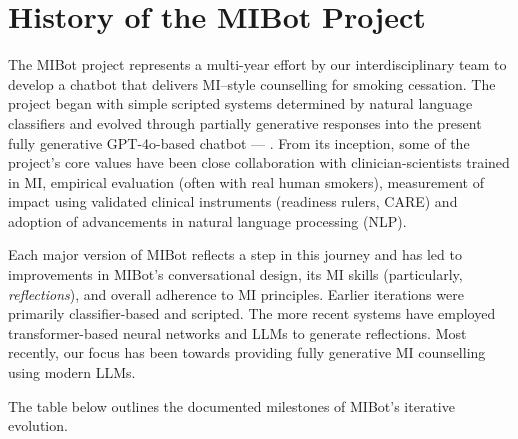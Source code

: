 \chapter{History of the MIBot Project}
\label{app:mibot_version_list}


\noindent The MIBot project represents a multi-year effort by our interdisciplinary team to develop a chatbot that delivers MI–style counselling for smoking cessation. The project began with simple scripted systems determined by natural language classifiers and evolved through partially generative responses into the present fully generative GPT-4o-based chatbot --- \sysnamewithv. From its inception, some of the project's core values have been close collaboration with clinician-scientists trained in MI, empirical evaluation (often with real human smokers), measurement of impact using validated clinical instruments (readiness rulers, CARE) and adoption of advancements in natural language processing (NLP).

\noindent Each major version of MIBot reflects a step in this journey and has led to improvements in MIBot's conversational design, its MI skills (particularly, \textit{reflections}), and overall adherence to MI principles. Earlier iterations were primarily classifier-based and scripted. The more recent systems have employed transformer-based neural networks and LLMs to generate reflections. Most recently, our focus has been towards providing fully generative MI counselling using modern LLMs. 

The table below outlines the documented milestones of MIBot's iterative evolution.


